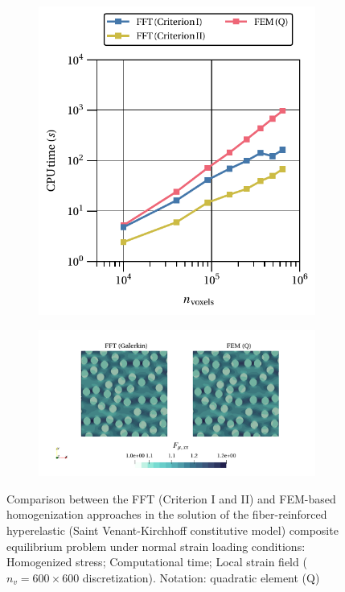\begin{figure}[hbt]
\begin{subfigure}[b]{0.49\textwidth}
    \includegraphics[width=\textwidth]{figures/svk_2D_normal_cpu_time_vs_n_voxels}
    \caption{}
    \label{subfig:svk_2D_normal_cpu_time_vs_n_voxels}
  \end{subfigure}
  \begin{subfigure}[b]{\textwidth}
    \centering
    \includegraphics[width=\textwidth]{figures/svk_2D_normal_strain_11}
    \caption{}
    \label{subfig:svk_2D_normal_strain_11}
  \end{subfigure}
  \caption{Comparison between the FFT (Criterion I and II) and FEM-based homogenization approaches in the
  solution of the fiber-reinforced hyperelastic (Saint Venant-Kirchhoff constitutive model) composite equilibrium problem under normal strain loading conditions:
   Homogenized stress;
   Computational time;
   Local strain field (\(n_v = 600 \times 600\)
  discretization). Notation: quadratic element (Q)}
\label{fig:svk_2D_normal}
\end{figure}

